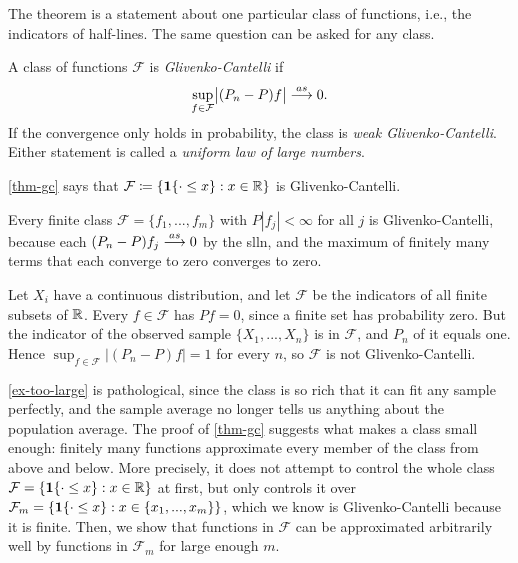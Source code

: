\documentclass[a4paper,12pt]{article}
\begin{document}
The  theorem is a statement about one particular class of functions, i.e., the indicators of half-lines.
The same question can be asked for any class.

\begin{definition}
	A class of functions $\mathcal F$ is \emph{Glivenko-Cantelli} if
	\begin{align}
		\sup_{f\in\mathcal F}\bigl|(P_n-P)f\bigr|\overset{as}{\longrightarrow}0.
	\end{align}
	If the convergence only holds in probability, the class is \emph{weak Glivenko-Cantelli}.
	Either statement is called a \emph{uniform law of large numbers}.
\end{definition}

\begin{remark}
	\autoref{thm-gc} says that $\mathcal{F}\coloneqq\{\mathbf{1}\{\cdot\le x\}:x\in\mathbb{R}\}$ is Glivenko-Cantelli.
\end{remark}

\begin{example}
	Every finite class $\mathcal F=\{f_1,...,f_m\}$ with $P|f_j|<\infty$ for all $j$ is Glivenko-Cantelli,
	because each $(P_n-P)f_j\overset{as}{\longrightarrow}0$ by the \gls{slln}, and the maximum of finitely many terms that each converge to zero converges to zero.
\end{example}

\begin{example}\label{ex-too-large}
	Let $X_i$ have a continuous distribution, and let $\mathcal F$ be the indicators of all finite subsets of $\mathbb{R}$.
	Every $f\in\mathcal F$ has $Pf=0$, since a finite set has probability zero.
	But the indicator of the observed sample $\{X_1,...,X_n\}$ is in $\mathcal F$, and $P_n$ of it equals one.
	Hence $\sup_{f\in\mathcal F}|(P_n-P)f|=1$ for every $n$, so $\mathcal F$ is not Glivenko-Cantelli.
\end{example}

\begin{remark}
	\autoref{ex-too-large} is pathological,
	since the class is so rich that it can fit any sample perfectly,
	and the sample average no longer tells us anything about the population average.
	The proof of \autoref{thm-gc} suggests what makes a class small enough:
	finitely many functions approximate every member of the class from above and below.
	More precisely,
	it does not attempt to control the whole class $\mathcal F=\{\mathbf{1}\{\cdot\leq x\}:x\in\mathbb{R}\}$ at first,
	but only controls it over $\mathcal F_m = \{\mathbf{1}\{\cdot\leq x\}:x\in\{x_1,...,x_m\}\}$,
	which we know is Glivenko-Cantelli because it is finite.
	Then, we show that functions in $\mathcal F$ can be approximated arbitrarily well by functions in $\mathcal F_m$ for large enough $m$.
\end{remark}
\end{document}
